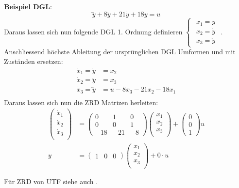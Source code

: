 \noindent\textbf{Beispiel DGL}:
\[
\dddot{y} + 8\ddot{y} + 21 \dot{y} + 18y = u
\]
Daraus lassen sich nun folgende DGL 1. Ordnung definieren $\begin{cases}\begin{matrix}
	x_1 = y \\
	x_2 = \dot{y}\\
	x_3 = \ddot{y}
\end{matrix}\end{cases}$. Anschliessend höchste Ableitung der ursprünglichen DGL Umformen und mit Zuständen ersetzen:
\begin{align*}
	\dot{x}_1 = \dot{y} &= x_2\\
	\dot{x}_2 = \ddot{y} &= x_3 \\
	\dot{x}_3 = \dddot{y} &= u - 8x_3 - 21x_2 -18x_1 \\
\end{align*}
Daraus lassen sich nun die ZRD Matrizen herleiten:
\begin{align*}
	\begin{pmatrix}
		\dot{x}_1 \\		\dot{x}_2 \\		\dot{x}_3 \\
	\end{pmatrix} &= \begin{pmatrix}
	0 & 1 & 0 \\
	0 &0 &1 \\
	-18 & -21 & -8
\end{pmatrix}\begin{pmatrix}
{x}_1 \\		{x}_2 \\		{x}_3 \\
\end{pmatrix} + \begin{pmatrix}
0 \\ 0 \\ 1
\end{pmatrix}u \\
y &= \begin{pmatrix}
	1 & 0 &0
\end{pmatrix}\begin{pmatrix}
{x}_1 \\		{x}_2 \\		{x}_3 \\
\end{pmatrix} + 0\cdot u
\end{align*}

Für ZRD von UTF siehe auch . 


